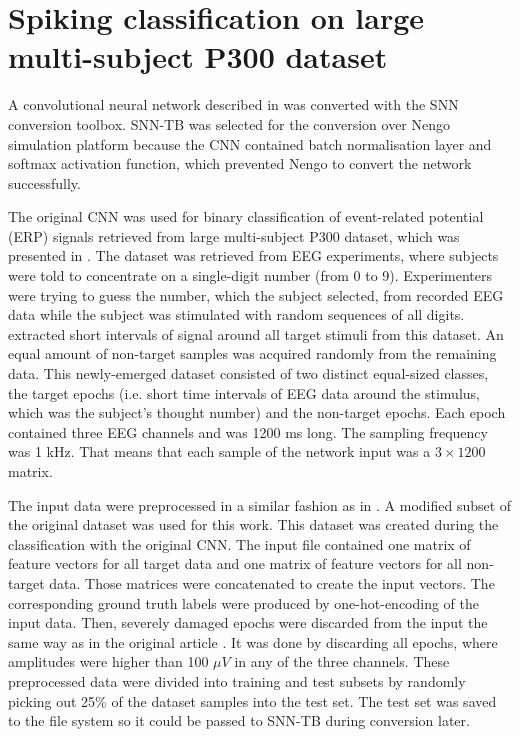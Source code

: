 \chapter{Spiking classification on large multi-subject P300 dataset} \label{chap:06}

A convolutional neural network described in \cite{varekaEvaluationConvolutional20} was converted with the SNN conversion toolbox. SNN-TB was selected for the conversion over Nengo simulation platform because the CNN contained batch normalisation layer and softmax activation function, which prevented Nengo to convert the network successfully. \par
The original CNN was used for binary classification of event-related potential (ERP) signals retrieved from large multi-subject P300 dataset, which was presented in \cite{moucekEventrelatedPotential17}. The dataset was retrieved from EEG experiments, where subjects were told to concentrate on a single-digit number (from 0 to 9). Experimenters were trying to guess the number, which the subject selected, from recorded EEG data while the subject was stimulated with random sequences of all digits. \cite{varekaEvaluationConvolutional20} extracted short intervals of signal around all target stimuli from this dataset. An equal amount of non-target samples was acquired randomly from the remaining data. This newly-emerged dataset consisted of two distinct equal-sized classes, the target epochs (i.e. short time intervals of EEG data around the stimulus, which was the subject's thought number) and the non-target epochs. Each epoch contained three EEG channels and was 1200 ms long. The sampling frequency was 1 kHz. That means that each sample of the network input was a $3 \times 1200$ matrix. \par
The input data were preprocessed in a similar fashion as in \cite{varekaEvaluationConvolutional20}. A modified subset \cite{moucekReplicationData19} of the original dataset was used for this work. This dataset was created during the classification with the original CNN. The input file contained one matrix of feature vectors for all target data and one matrix of feature vectors for all non-target data. Those matrices were concatenated to create the input vectors. The corresponding ground truth labels were produced by one-hot-encoding of the input data. Then, severely damaged epochs were discarded from the input the same way as in the original article \cite{varekaEvaluationConvolutional20}. It was done by discarding all epochs, where amplitudes were higher than 100 $\mu V$ in any of the three channels. These preprocessed data were divided into training and test subsets by randomly picking out 25\% of the dataset samples into the test set. The test set was saved to the file system so it could be passed to SNN-TB during conversion later. \par

